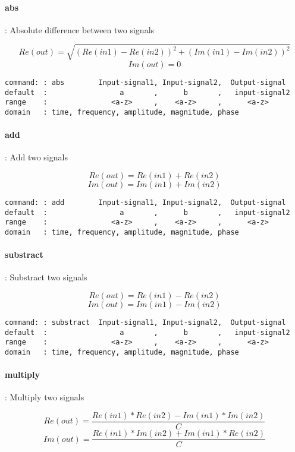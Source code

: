 \documentclass{report}
\newcommand{\bc}{\scriptsize}
\newcommand{\ec}{\normalsize}
\begin{document}
\paragraph{abs}: Absolute difference between two signals

\[ Re(out) = \sqrt{ (Re(in1) - Re(in2))^{2} + (Im(in1) - Im(in2))^{2} } \]
\[ Im(out) = 0 \]

\bc
\begin{verbatim}
command: : abs        Input-signal1, Input-signal2,  Output-signal
default  :                 a       ,      b       ,   input-signal2
range    :               <a-z>     ,    <a-z>     ,      <a-z>
domain   : time, frequency, amplitude, magnitude, phase
\end{verbatim}
\ec

\paragraph{add}: Add two signals

\[ Re(out) = Re(in1) + Re(in2) \]
\[ Im(out) = Im(in1) + Im(in2) \]

\bc
\begin{verbatim}
command: : add        Input-signal1, Input-signal2,  Output-signal
default  :                 a       ,      b       ,   input-signal2
range    :               <a-z>     ,    <a-z>     ,      <a-z>
domain   : time, frequency, amplitude, magnitude, phase
\end{verbatim}
\ec

\paragraph{substract}: Substract two signals

\[ Re(out) = Re(in1) - Re(in2) \]
\[ Im(out) = Im(in1) - Im(in2) \]

\bc
\begin{verbatim}
command: : substract  Input-signal1, Input-signal2,  Output-signal
default  :                 a       ,      b       ,   input-signal2
range    :               <a-z>     ,    <a-z>     ,      <a-z>
domain   : time, frequency, amplitude, magnitude, phase
\end{verbatim}
\ec

\paragraph{multiply}: Multiply two signals

\[ Re(out) = \frac{ Re(in1) * Re(in2) - Im(in1) * Im(in2) }{C} \]
\[ Im(out) = \frac{ Re(in1) * Im(in2) + Im(in1) * Re(in2) }{C} \]
\end{document}
